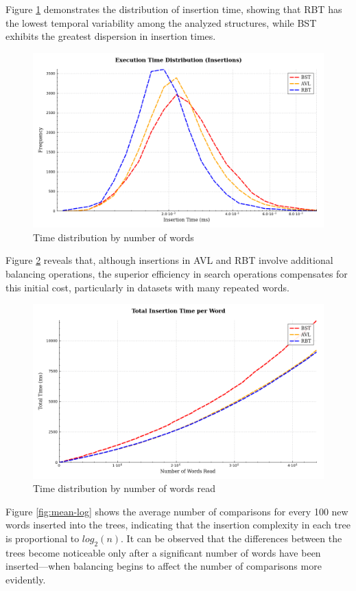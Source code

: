  Figure \ref{fig:timedist} demonstrates the distribution of insertion time,
 showing that RBT has the lowest temporal variability among the analyzed structures,
 while BST exhibits the greatest dispersion in insertion times.

 \begin{figure}[H]
     \centering
     \includegraphics[width=0.8\linewidth]{img/Graph_5_20273.pdf}
     \caption{Time distribution by number of words}
     \label{fig:timedist}
 \end{figure}

 Figure \ref{fig:cumulativedist} reveals that, although insertions in AVL and RBT
 involve additional balancing operations, the superior efficiency in search operations
 compensates for this initial cost, particularly in datasets with many repeated words.

 \begin{figure}[H]
     \centering
     \includegraphics[width=0.8\linewidth]{img/Graph_4_20273.pdf}
     \caption{Time distribution by number of words read}
     \label{fig:cumulativedist}
 \end{figure}
Figure \ref{fig:mean-log} shows the average number of comparisons for every 100 new words inserted into the trees, indicating that the insertion complexity in each tree is proportional to $log_2(n)$. It can be observed that the differences between the trees become noticeable only after a significant number of words have been inserted—when balancing begins to affect the number of comparisons more evidently.

